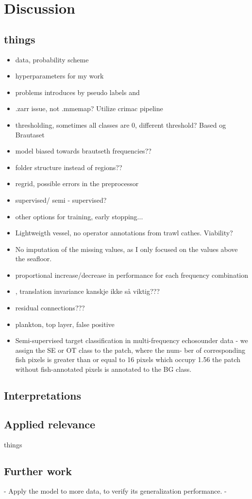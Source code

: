 \chapter{Discussion}
    \section{things}
        \begin{itemize}
            \item data, probability scheme
            \item hyperparameters for my work
            \item problems introduces by pseudo labels and 
            \item .zarr issue, not .mmemap? Utilize crimac pipeline
            \item thresholding, sometimes all classes are 0, different threshold? Based og Brautaset
            \item model biased towards brautseth frequencies??
            \item folder structure instead of regions??
            \item regrid, possible errors in the preprocessor 
            \item supervised/ semi - supervised? 
            \item other options for training, early stopping...
            \item Lightweigth vessel, no operator annotations from trawl cathes. Viability?
            \item No imputation of the missing values, as I only focused on the values above the seafloor.
            \item proportional increase/decrease in performance for each frequency combination \item \citet{mohammed2006acoustic}, translation invariance kanskje ikke så viktig???
            \item residual connections??? \cite{zhang2018road}
            \item plankton, top layer, false positive
            \item Semi-supervised target classification in multi-frequency
echosounder data - we assign the SE or OT class to the patch, where the num-
ber of corresponding fish pixels is greater than or equal to 16 pixels
which occupy 1.56%
the patch without fish-annotated pixels is annotated to the BG class.
        \end{itemize}

    \section{Interpretations}
    \section{Applied relevance}
        things
    
    
    \section{Further work}
        - Apply the model to more data, to verify its generalization performance.
        - 